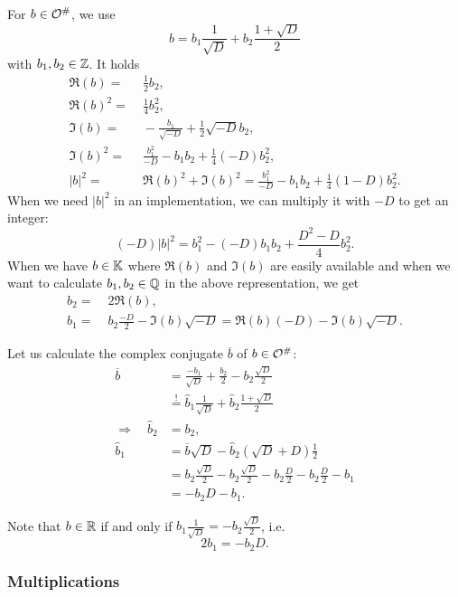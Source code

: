For $b \in \mathcal{O}^\#$, we use
\[ b = b_1 \frac{1}{\sqrt{D}} + b_2 \frac{1 + \sqrt{D}} {2} \]
with $b_1,b_2 \in \mathbb{Z}$.
It holds
\begin{align*}
\Re(b) = &\; \frac{1}{2} b_2, \\
\Re(b)^2 = &\; \frac{1}{4} b_2^2, \\
\Im(b) = &\; -\frac{b_1}{\sqrt{-D}} + \frac{1}{2} \sqrt{-D} b_2, \\
\Im(b)^2 = &\; \frac{b_1^2}{-D} - b_1 b_2 + \frac{1}{4} (-D) b_2^2, \\
|b|^2 = &\; \Re(b)^2 + \Im(b)^2 = \frac{b_1^2}{-D} - b_1 b_2 + \frac{1}{4} (1-D) b_2^2 .
\end{align*}
When we need $|b|^2$ in an implementation, we can multiply it with $-D$ to get an integer:
\[ (-D) |b|^2 = b_1^2 - (-D) b_1 b_2 + \frac{D^2-D}{4} b_2^2 . \]
%
When we have $b \in \mathbb{K}$ where $\Re(b)$ and $\Im(b)$ are easily available and when we want to calculate $b_1,b_2 \in \mathbb{Q}$ in the above representation, we get
\begin{align*}
b_2 =&\; 2 \Re(b) , \\
b_1 =&\; b_2 \frac{-D}{2} - \Im(b) \sqrt{-D} = \Re(b) (-D) - \Im(b) \sqrt{-D} .
\end{align*}

Let us calculate the complex conjugate $\overline{b}$ of $b \in \mathcal{O}^\#$:
\begin{align*}
\overline{b} &= \frac{-b_1}{\sqrt{D}} + \frac{b_2}{2} - b_2 \frac{\sqrt{D}}{2} \\
&\overset{!}{=} \hat{b}_1 \frac{1}{\sqrt{D}} + \hat{b}_2 \frac{1 + \sqrt{D}} {2} \\
\Rightarrow \quad \hat{b}_2 &= b_2 , \\
\hat{b}_1 &= \overline{b} \sqrt{D} - \hat{b}_2 (\sqrt{D}+D) \tfrac{1}{2} \\
&= b_2 \frac{\sqrt{D}}{2} - b_2 \frac{\sqrt{D}}{2} - b_2 \frac{D}{2} - b_2 \frac{D}{2} - b_1 \\
&= -b_2 D - b_1 .
\end{align*}

Note that $b \in \mathbb{R}$ if and only if $b_1 \frac{1}{\sqrt{D}} = - b_2 \frac{\sqrt{D}}{2}$, i.e.
\[ 2 b_1 = - b_2 D . \]

\subsubsection{Multiplications}


